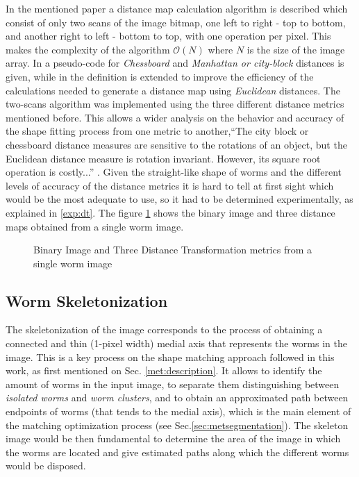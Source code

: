 In the mentioned paper a distance map calculation algorithm is described which consist
of only two scans of the image bitmap, one left to right - top to bottom, and another
right to left - bottom to top, with one operation per pixel. This makes the complexity
of the algorithm $\mathcal{O}(N)$ where $N$ is the size of the image array.
In \cite[p.197]{fastdt} a pseudo-code for \emph{Chessboard} and 
\emph{Manhattan or city-block} distances is given, while in \cite[p.198]{fastdt} the 
definition is extended to improve the efficiency of the calculations needed to 
generate a distance map using \emph{Euclidean} distances.
The two-scans algorithm was implemented using the three different distance metrics
mentioned before. This allows a wider analysis on the behavior and accuracy of the shape 
fitting process from one metric to another,``The city block or chessboard distance
measures are sensitive to the rotations of an object, but the Euclidean distance
measure is rotation invariant. However, its square root operation is costly...''
\cite[p.332]{eucskeleton}. Given the straight-like shape of worms and the different levels
of accuracy of the distance metrics it is hard to tell at first sight which would be 
the most adequate to use, so it had to be determined experimentally, as explained in \ref{exp:dt}.
The figure \ref{fig:distance} shows the binary image and three distance maps obtained 
from a single worm image.

\begin{figure}[h t b p ! H]
  \centering
\qquad
\qquad                
\qquad
  \caption{Binary Image and Three Distance Transformation metrics from a single worm image}
  \label{fig:distance}
\end{figure}


\subsection{Worm Skeletonization}
\label{sec:metsk}

The skeletonization of the image corresponds to the process of obtaining a 
connected and thin (1-pixel width) medial axis that represents the worms in the 
image. This is a key process on the shape matching
approach followed in this work, as first mentioned on Sec. \ref{met:description}.
It allows to identify the amount of worms in the input image, to separate them 
distinguishing between \emph{isolated worms} and \emph{worm clusters}, and to
obtain an approximated path between endpoints 
of worms (that tends to the medial axis), which is the main element of the 
matching optimization process (see Sec.\ref{sec:metsegmentation}). The skeleton
image would be then fundamental to determine the area of the image in which
the worms are located and give estimated paths along which the different
worms would be disposed. \\

